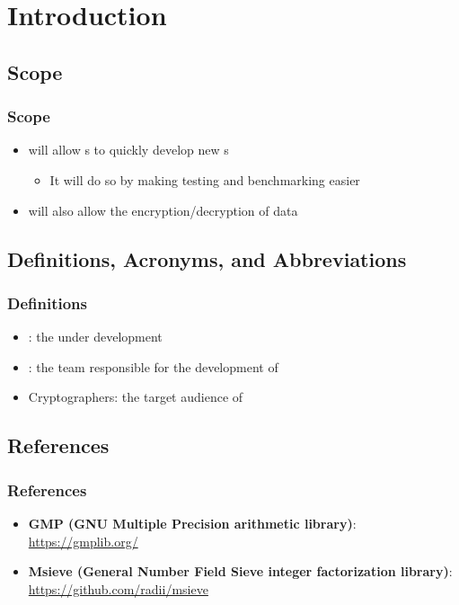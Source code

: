 
\section{Introduction}


\subsection{Scope}

\begin{frame}
\frametitle{Scope}
\begin{itemize}
\item \cry{} will allow \cg s to quickly develop new \cs{}s
\begin{itemize}
  \item It will do so by making testing and benchmarking
  easier
\end{itemize}
\item \cry{} will also allow the encryption/decryption of
data
\end{itemize}
\end{frame}


\subsection{Definitions, Acronyms, and Abbreviations}

\begin{frame}
\frametitle{Definitions}
\begin{itemize}
\item \cry{}: the \cf{} under development
\item \tc{}: the team responsible for the
  development of \cry{}
\item Cryptographers: the target audience of \cry
\end{itemize}
\end{frame}


\subsection{References}

\begin{frame}
\frametitle{References}
\begin{itemize}
\item \textbf{GMP (GNU Multiple Precision arithmetic library)}:
  \url{https://gmplib.org/}
\item \textbf{Msieve (General Number Field Sieve
  integer factorization library)}:
  \url{https://github.com/radii/msieve}
\end{itemize}
\end{frame}

